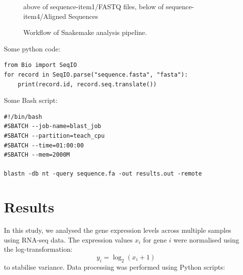 \documentclass[12pt]{article}
\begin{document}
\begin{figure}[htbp]
\begin{center}
\vspace{3em}
{above of sequence-item1/FASTQ files, below of sequence-item4/Aligned Sequences}
\vspace{4em}
\caption{Workflow of Snakemake analysis pipeline.}
    \label{fig:workflow}
\end{center}
\end{figure}




Some python code: 
\begin{verbatim}
from Bio import SeqIO
for record in SeqIO.parse("sequence.fasta", "fasta"):
    print(record.id, record.seq.translate())
\end{verbatim} 

Some Bash script:
\begin{verbatim}
#!/bin/bash
#SBATCH --job-name=blast_job
#SBATCH --partition=teach_cpu
#SBATCH --time=01:00:00
#SBATCH --mem=2000M

blastn -db nt -query sequence.fa -out results.out -remote
\end{verbatim}



\section*{Results}
In this study, we analysed the gene expression levels across multiple samples using RNA-seq data. The expression values $x_i$ for gene $i$ were normalised using the log-transformation:
\[
y_i = \log_2(x_i + 1)
\]
to stabilise variance. Data processing was performed using Python scripts:
\end{document}
